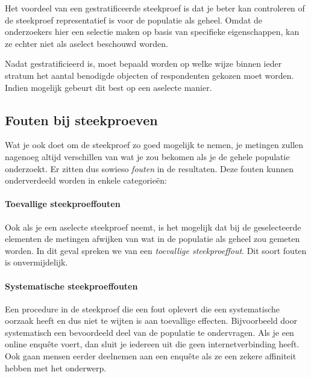 Het voordeel van een gestratificeerde steekproef is dat je beter kan controleren of de steekproef representatief is voor de populatie als geheel. Omdat de onderzoekers hier een selectie maken op basis van specifieke eigenschappen, kan ze echter niet als aselect beschouwd worden.

Nadat gestratificieerd is, moet bepaald worden op welke wijze binnen ieder stratum het aantal benodigde objecten of respondenten gekozen moet worden. Indien mogelijk gebeurt dit best op een aselecte manier.



\subsection{Fouten bij steekproeven}

Wat je ook doet om de steekproef zo goed mogelijk te nemen, je metingen zullen nagenoeg altijd verschillen van wat je zou bekomen als je de gehele populatie onderzoekt. Er zitten dus sowieso \emph{fouten} in de resultaten. Deze fouten kunnen onderverdeeld worden in enkele categorie\"en:

\paragraph{Toevallige steekproeffouten}

Ook als je een aselecte steekproef neemt, is het mogelijk dat bij de geselecteerde elementen de metingen afwijken van wat in de populatie als geheel zou gemeten worden. In dit geval spreken we van een \emph{toevallige steekproeffout}. Dit soort fouten is onvermijdelijk.

\paragraph{Systematische steekproeffouten}

Een procedure in de steekproef die een fout oplevert die een systematische oorzaak heeft en dus niet te wijten is aan toevallige effecten. Bijvoorbeeld door systematisch een bevoordeeld deel van de populatie te ondervragen. Als je een online enqu\^ete voert, dan sluit je iedereen uit die geen internetverbinding heeft. Ook gaan mensen eerder deelnemen aan een enquête als ze een zekere affiniteit hebben met het onderwerp.

